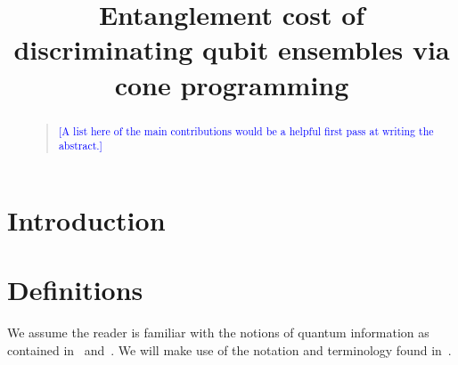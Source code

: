 \documentclass[11pt]{article}
\theoremstyle{definition}
\newcommand{\comment}[1]{\begin{quote}\sf 
    \textcolor{blue}{[#1]}\end{quote}}
\begin{document}
\title{\LARGE\bf Entanglement cost of discriminating qubit ensembles via
cone programming}

\author[1]{}
  
\renewcommand\Affilfont{\normalsize\itshape}
\renewcommand\Authfont{\large}
\setlength{\affilsep}{6mm}
\renewcommand\Authand{\rule{10mm}{0mm}}

\maketitle

\begin{abstract}
\comment{A list here of the main contributions would be a helpful first pass at
    writing the abstract.}
\end{abstract}

\section{Introduction}
\label{sec:intro}

\section{Definitions}
\label{sec:definitions}

We assume the reader is familiar with the notions of quantum information as
contained in~\cite{nielsen2002quantum} and~\cite{wilde2013quantum}. We will
make use of the notation and terminology found in~\cite{watrous2018theory}.
\end{document}
